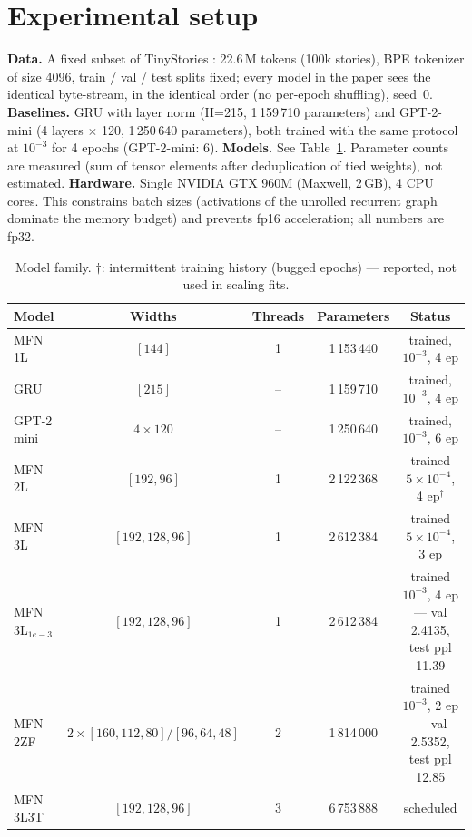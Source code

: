 \documentclass[11pt]{article}
\begin{document}
\section{Experimental setup}\label{sec:setup}
\textbf{Data.} A fixed subset of TinyStories \citep{eldan2023tinystories}:
22.6\,M tokens (100k stories), BPE tokenizer of size 4096, train / val /
test splits fixed; every model in the paper sees the identical byte-stream,
in the identical order (no per-epoch shuffling), seed~0.
\textbf{Baselines.} GRU with layer norm (H=215, 1\,159\,710
parameters) and GPT-2-mini (4 layers $\times$ 120, 1\,250\,640 parameters),
both trained with the same protocol at $10^{-3}$ for 4 epochs (GPT-2-mini:
6).
\textbf{Models.} See Table~\ref{tab:models}. Parameter counts are measured
(sum of tensor elements after deduplication of tied weights), not
estimated.
\textbf{Hardware.} Single NVIDIA GTX 960M (Maxwell, 2\,GB), 4 CPU cores.
This constrains batch sizes (activations of the unrolled recurrent graph
dominate the memory budget) and prevents fp16 acceleration; all numbers are
fp32.

\begin{table}[t]\centering\small
\caption{Model family. $\dagger$: intermittent training history (bugged
epochs) --- reported, not used in scaling fits.}\label{tab:models}
\begin{tabular}{lcccc}
\toprule
Model & Widths & Threads & Parameters & Status \\
\midrule
MFN 1L & $[144]$ & 1 & 1\,153\,440 & trained, $10^{-3}$, 4 ep \\
GRU & $[215]$ & -- & 1\,159\,710 & trained, $10^{-3}$, 4 ep \\
GPT-2 mini & $4\times120$ & -- & 1\,250\,640 & trained, $10^{-3}$, 6 ep \\
MFN 2L & $[192,96]$ & 1 & 2\,122\,368 & trained $5\!\times\!10^{-4}$, 4 ep$^\dagger$ \\
MFN 3L & $[192,128,96]$ & 1 & 2\,612\,384 & trained $5\!\times\!10^{-4}$, 3 ep \\
MFN 3L$_{1e-3}$ & $[192,128,96]$ & 1 & 2\,612\,384 & trained $10^{-3}$, 4 ep --- val 2.4135, test ppl 11.39 \\
MFN 2ZF & $2\times[160,112,80]/[96,64,48]$ & 2 & 1\,814\,000 & trained $10^{-3}$, 2 ep --- val 2.5352, test ppl 12.85 \\
MFN 3L3T & $[192,128,96]$ & 3 & 6\,753\,888 & scheduled \\
\bottomrule
\end{tabular}
\end{table}
\end{document}
